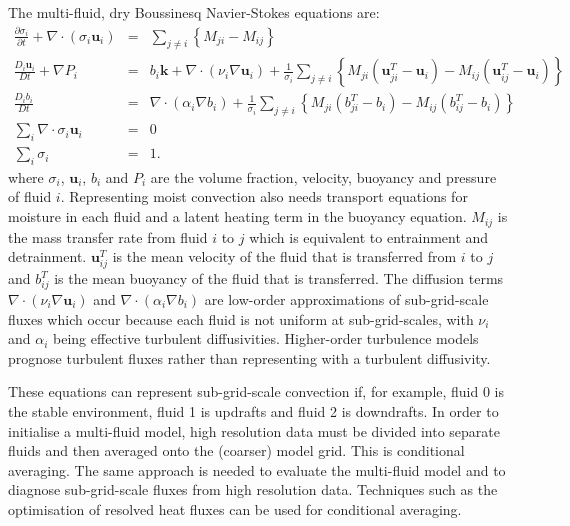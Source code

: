 \documentclass[11pt,a4paper]{article}
\begin{document}
The multi-fluid, dry Boussinesq Navier-Stokes equations \cite[approximated by][]{WMS20} are:
\begin{eqnarray}
\frac{\partial\sigma_{i}}{\partial t}+\nabla\cdot(\sigma_{i}\mathbf{u}_{i}) & = & {\textstyle\sum}_{j\ne i}\left\{ M_{ji}-M{}_{ij}\right\} \label{eq:sigma}\\
\frac{D_{i}\mathbf{u}_{i}}{Dt}+\nabla P_{i} & = & b_{i}\mathbf{k}+\nabla\cdot\left( \nu_i\nabla\mathbf{u}_{i}\right)+\frac{1}{\sigma_{i}}{\textstyle\sum}_{j\ne i}\left\{ M_{ji}\left(\mathbf{u}_{ji}^{T}-\mathbf{u}_{i}\right)-M_{ij}\left(\mathbf{u}_{ij}^{T}-\mathbf{u}_{i}\right)\right\} \label{eq:mom}\\
\frac{D_{i}b_{i}}{Dt} & = & \nabla\cdot \left(\alpha_i \nabla b_{i}\right)+\frac{1}{\sigma_{i}}{\textstyle\sum}_{j\ne i}\left\{ M_{ji}\left(b_{ji}^{T}-b_{i}\right)-M_{ij}\left(b_{ij}^{T}-b_{i}\right)\right\} \label{eq:b}\\
{\textstyle\sum}_{i}\nabla\cdot\sigma_{i}\mathbf{u}_{i} & = & 0\label{eq:divFree}\\
{\textstyle\sum}_{i}\sigma_{i} & = & 1.\label{eq:sumOne}
\end{eqnarray}
where $\sigma_i$, $\mathbf{u}_i$, $b_i$ and $P_i$ are the volume fraction, velocity, buoyancy and pressure of fluid $i$. Representing moist convection also needs transport equations for moisture in each fluid and a latent heating term in the buoyancy equation. $M_{ij}$ is the mass transfer rate from fluid $i$ to $j$ which is equivalent to entrainment and detrainment. $\mathbf{u}_{ij}^T$ is the mean velocity of the fluid that is transferred from $i$ to $j$ and $b_{ij}^T$ is the mean buoyancy of the fluid that is transferred. The diffusion terms $\nabla\cdot\left( \nu_i\nabla\mathbf{u}_{i}\right)$ and $\nabla\cdot \left(\alpha_i \nabla b_{i}\right)$ are low-order approximations of sub-grid-scale fluxes which occur because each fluid is not uniform at sub-grid-scales, with $\nu_i$ and $\alpha_i$ being effective turbulent diffusivities. Higher-order turbulence models prognose turbulent fluxes rather than representing with a turbulent diffusivity. 

These equations can represent sub-grid-scale convection if, for example, fluid 0 is the stable environment, fluid 1 is updrafts and fluid 2 is downdrafts. In order to initialise a multi-fluid model, high resolution data must be divided into separate fluids and then averaged onto the (coarser) model grid. This is conditional averaging. The same approach is needed to evaluate the multi-fluid model and to diagnose sub-grid-scale fluxes from high resolution data. Techniques such as the optimisation of resolved heat fluxes \cite[]{ETB20} can be used for conditional averaging.
\end{document}
